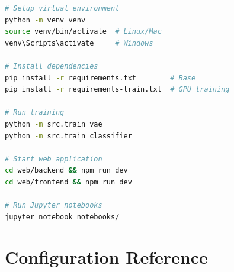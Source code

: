 \documentclass[11pt,a4paper]{article}
\begin{document}
\begin{lstlisting}[language=bash, caption={Common Commands}]
# Setup virtual environment
python -m venv venv
source venv/bin/activate  # Linux/Mac
venv\Scripts\activate     # Windows

# Install dependencies
pip install -r requirements.txt        # Base
pip install -r requirements-train.txt  # GPU training

# Run training
python -m src.train_vae
python -m src.train_classifier

# Start web application
cd web/backend && npm run dev
cd web/frontend && npm run dev

# Run Jupyter notebooks
jupyter notebook notebooks/
\end{lstlisting}

\section{Configuration Reference}
\label{app:config}
\end{document}
